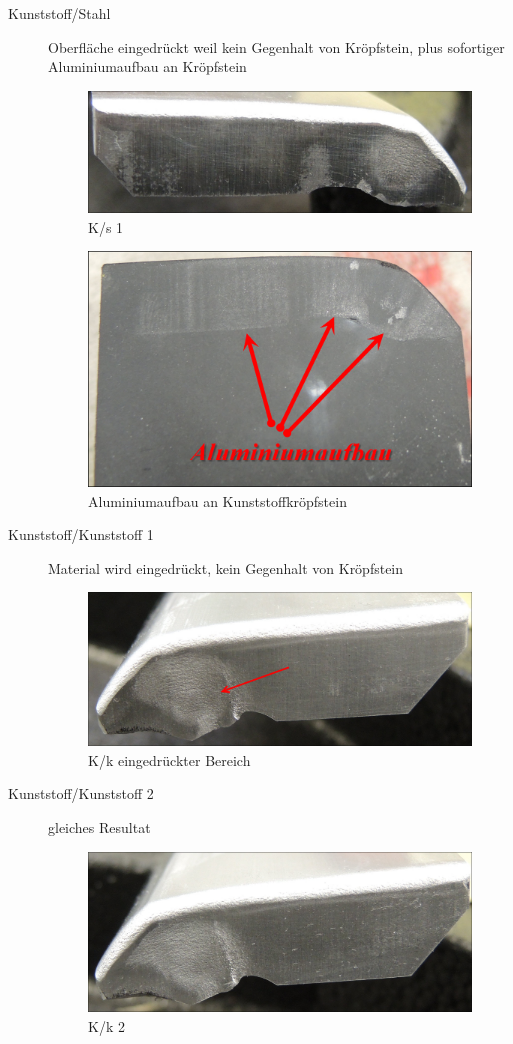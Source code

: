 \documentclass[12pt,a4paper,parskip]{scrartcl}
\begin{document}
\begin{description}
\item[Kunststoff/Stahl] Oberfläche eingedrückt weil kein Gegenhalt von Kröpfstein, plus sofortiger Aluminiumaufbau an Kröpfstein
\begin{figure}[H]
\centering
\includegraphics[width=.8\textwidth]{Ks1}
\caption{K/s 1}
\label{fig:Ks1}
\end{figure}
\begin{figure}[H]
\centering
\includegraphics[width=.8\textwidth]{SteinKAlubau}
\caption{Aluminiumaufbau an Kunststoffkröpfstein}
\label{fig:SteinKAlubau}
\end{figure}

\item[Kunststoff/Kunststoff 1] Material wird eingedrückt, kein Gegenhalt von Kröpfstein
\begin{figure}[H]
\centering
\includegraphics[width=.8\textwidth]{Kk1a}
\caption{K/k eingedrückter Bereich}
\label{fig:Kk}
\end{figure}

\item[Kunststoff/Kunststoff 2] gleiches Resultat
\begin{figure}[H]
\centering
\includegraphics[width=.8\textwidth]{Kk2}
\caption{K/k 2}
\label{fig:Kb1a}
\end{figure}


\end{description}
\end{document}

